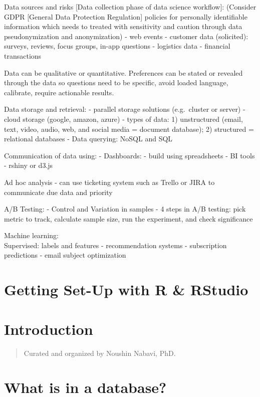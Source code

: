 \documentclass[]{book}
\begin{document}
Data sources and risks {[}Data collection phase of data science workflow{]}:
(Consider GDPR {[}General Data Protection Regulation{]} policies for personally identifiable information which needs to treated with sensitivity and caution through data pseudonymization and anonymization)
- web events
- customer data (solicited): surveys, reviews, focus groups, in-app questions
- logistics data
- financial transactions

Data can be qualitative or quantitative.
Preferences can be stated or revealed through the data so questions need to be specific, avoid loaded language, calibrate, require actionable results.

Data storage and retrieval:
- parallel storage solutions (e.g.~cluster or server)
- cloud storage (google, amazon, azure)
- types of data: 1) unstructured (email, text, video, audio, web, and social media = document database); 2) structured = relational databases
- Data querying: NoSQL and SQL

Communication of data using:
- Dashboards:
- build using spreadsheets
- BI tools
- rshiny or d3.js

Ad hoc analysis
- can use ticketing system such as Trello or JIRA to communicate due data and priority

A/B Testing:
- Control and Variation in samples
- 4 steps in A/B testing: pick metric to track, calculate sample size, run the experiment, and check significance

Machine learning:\\
Supervised: labels and features
- recommendation systems
- subscription predictions
- email subject optimization

\hypertarget{getting-set-up-with-r-rstudio}{%
\chapter{Getting Set-Up with R \& RStudio}\label{getting-set-up-with-r-rstudio}}

\hypertarget{intro}{%
\chapter{Introduction}\label{intro}}

\begin{quote}
Curated and organized by Noushin Nabavi, PhD.
\end{quote}

\hypertarget{what-is-in-a-database}{%
\chapter{What is in a database?}\label{what-is-in-a-database}}
\end{document}
